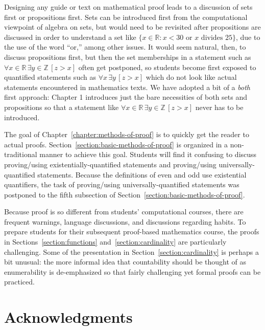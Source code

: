 \documentclass{book}
\theoremstyle{ekimcustom}
\begin{document}
Designing any guide or text on mathematical proof leads to a discussion of sets first or propositions first. Sets can be introduced first from the computational viewpoint of algebra on sets, but would need to be revisited after propositions are discussed in order to understand a set like $\{x \in \mathbb{R} : x < 30 \text{ or } x \text{ divides } 25\}$, due to the use of the word ``or,'' among other issues. It would seem natural, then, to discuss propositions first, but then the set memberships in a statement such as $\forall x \in \mathbb{R}\, \exists y \in \mathbb{Z}\, [z > x]$ often get postponed, so students become first exposed to quantified statements such as $\forall x\, \exists y\, [z>x]$ which do not look like actual statements encountered in mathematics texts. We have adopted a bit of a \emph{both} first approach: Chapter 1 introduces just the bare necessities of both sets and propositions so that a statement like $\forall x \in \mathbb{R}\, \exists y \in \mathbb{Z}\, [z > x]$ never has to be introduced.

The goal of Chapter~\ref{chapter:methods-of-proof} is to quickly get the reader to actual proofs. Section~\ref{section:basic-methods-of-proof} is organized in a non-traditional manner to achieve this goal. Students will find it confusing to discuss proving/using existentially-quantified statements and proving/using universally-quantified statements. Because the definitions of even and odd use existential quantifiers, the task of proving/using universally-quantified statements was postponed to the fifth subsection of Section~\ref{section:basic-methods-of-proof}.

Because proof is so different from students' computational courses, there are frequent warnings, language discussions, and discussions regarding habits. To prepare students for their subsequent proof-based mathematics course, the proofs in Sections~\ref{section:functions} and~\ref{section:cardinality} are particularly challenging. Some of the presentation in Section~\ref{section:cardinality} is perhaps a bit unusual: the more informal idea that countability should be thought of as enumerability is de-emphasized so that fairly challenging yet formal proofs can be practiced.


\chapter*{Acknowledgments}
\end{document}
